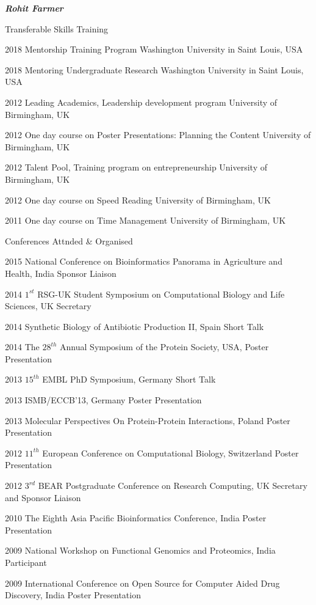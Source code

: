 \documentclass[10pt]{article}
\begin{document}
\begin{cv}{\huge \it \bfseries Rohit Farmer}
\vskip3pt
\begin{cvlist}{Transferable Skills Training}
	\item[2018] Mentorship Training Program \hfill Washington University in Saint Louis, USA
	\item[2018] Mentoring Undergraduate Research \hfill Washington University in Saint Louis, USA
	\item[2012] Leading Academics, Leadership development program \hfill University of Birmingham, UK
	\item[2012] One day course on Poster Presentations: Planning the Content \hfill University of Birmingham, UK
	\item[2012] Talent Pool, Training program on entrepreneurship \hfill University of Birmingham, UK
	\item[2012] One day course on Speed Reading \hfill University of Birmingham, UK
	\item[2011] One day course on Time Management \hfill University of Birmingham, UK
\end{cvlist}

\vskip3pt
\begin{cvlist}{Conferences Attnded \& Organised}
	\item[2015] National Conference on Bioinformatics Panorama in Agriculture and Health, India \hfill Sponsor Liaison
	\item[2014] $1^{st}$ RSG-UK Student Symposium on Computational Biology and Life Sciences, UK \hfill Secretary
	\item[2014] Synthetic Biology of Antibiotic Production II, Spain \hfill Short Talk
	\item[2014] The $28^{th}$ Annual Symposium of the Protein Society, USA, \hfill Poster Presentation
	\item[2013] $15^{th}$ EMBL PhD Symposium, Germany \hfill Short Talk
	\item[2013] ISMB/ECCB'13, Germany \hfill Poster Presentation
	\item[2013] Molecular Perspectives On Protein-Protein Interactions, Poland \hfill Poster Presentation
	\item[2012] $11^{th}$ European Conference on Computational Biology, Switzerland \hfill Poster Presentation
	\item[2012] $3^{rd}$ BEAR Postgraduate Conference on Research Computing, UK \hfill Secretary and Sponsor Liaison
	\item[2010] The Eighth Asia Pacific Bioinformatics Conference, India \hfill Poster Presentation
	\item[2009] National Workshop on Functional Genomics and Proteomics, India \hfill Participant
	\item[2009] International Conference on Open Source for Computer Aided Drug Discovery, India \hfill Poster Presentation
\end{cvlist}


\end{cv}
\end{document}
